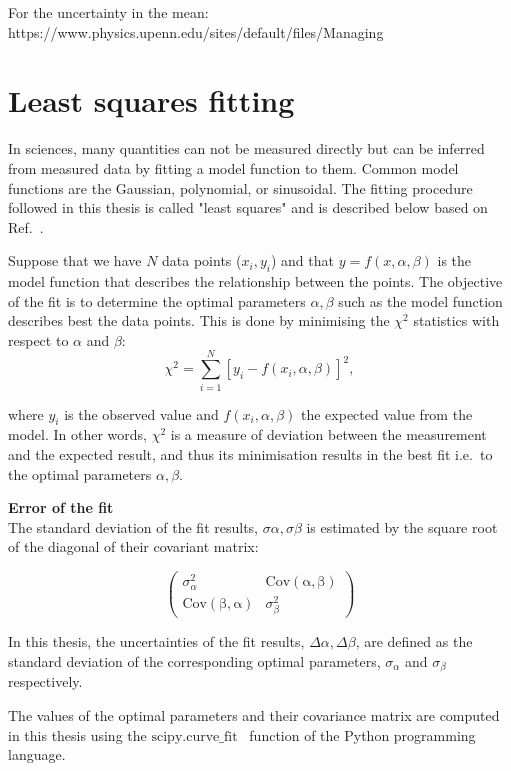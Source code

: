 For the uncertainty in the mean:
https://www.physics.upenn.edu/sites/default/files/Managing%


\section{Least squares fitting}\label{app:non_linear_fitting}
In sciences, many quantities can not be measured directly but can be inferred from measured data by fitting a model function to them. Common model functions are the Gaussian, polynomial, or sinusoidal. The fitting procedure followed in this thesis is called "least squares" and is described below based on Ref.~\cite{least_square_minimisation}.

Suppose that we have $N$ data points ($x_{i}, y_{i}$) and that $y=f(x,\alpha, \beta)$ is the model function that describes the relationship between the points. The objective of the fit is to determine the optimal parameters $\alpha, \beta$ such as the model function describes best the data points. This is done by minimising the $\chi^2$ statistics with respect to $\alpha$ and $\beta$:
\begin{equation}\label{eq:chi_square}
    \chi^2 = \sum_{i=1}^{N}[y_{i}-f(x_{i},\alpha, \beta)]^2,
\end{equation}

where $y_{i}$ is the observed value and $f(x_{i},\alpha, \beta)$ the expected value from the model. In other words, $\chi^2$ is a measure of deviation between the measurement and the expected result, and thus its minimisation results in the best fit i.e.\ to the optimal parameters $\alpha, \beta$.


\normalsize{\textbf{Error of the fit}}\\
The standard deviation of the fit results, $\sigma \alpha, \sigma \beta$ is estimated by the square root of the diagonal of their covariant matrix:

\begin{equation}\label{eq:cov_matrix_fit_results}
    \begin{pmatrix}
        \sigma_{\alpha}^2 & \mathrm{Cov(\alpha, \beta)}\\
        \mathrm{Cov(\beta, \alpha)} & \sigma_{\beta}^2
        \end{pmatrix}
\end{equation}

In this thesis, the uncertainties of the fit results, $\Delta \alpha, \Delta \beta$, are defined as the standard deviation of the corresponding optimal parameters, $\sigma_{\alpha}$ and  $\sigma_{\beta}$ respectively.

The values of the optimal parameters and their covariance matrix are computed in this thesis using the $\mathrm{scipy.curve \_ fit}$~\cite{scipy_curve_fit} function of the Python programming language.